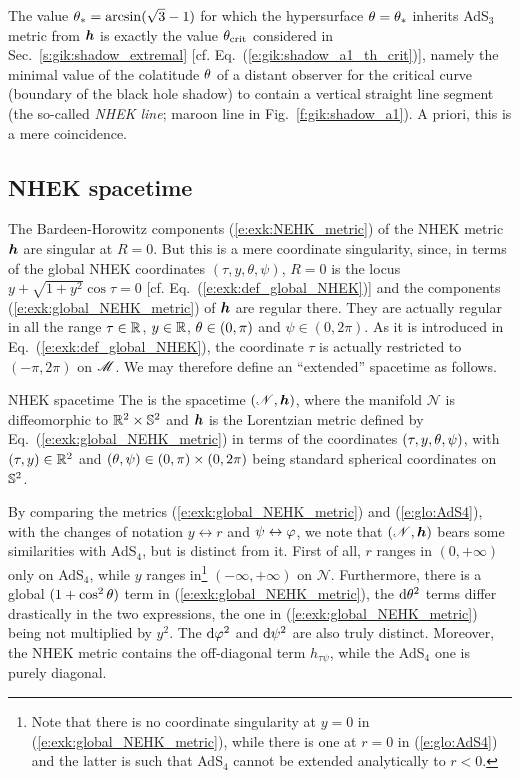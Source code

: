 \begin{remark}
The value $\theta_* = \arcsin(\sqrt{3} - 1)$ for which the hypersurface
$\theta = \theta_*$ inherits AdS$_3$ metric from $\bm{h}$ is exactly
the value $\theta_{\rm crit}$ considered in Sec.~\ref{s:gik:shadow_extremal}
[cf. Eq.~(\ref{e:gik:shadow_a1_th_crit})], namely
the minimal value of the colatitude $\theta$ of a distant observer
for the critical curve
(boundary of the black hole shadow) to contain a vertical straight line segment
(the so-called \emph{NHEK line}; maroon line in Fig.~\ref{f:gik:shadow_a1}).
A priori, this is a mere coincidence.
\end{remark}



\subsection{NHEK spacetime} \label{s:exk:NHEK_spacetime}

The Bardeen-Horowitz components (\ref{e:exk:NEHK_metric}) of the NHEK metric $\bm{h}$
are singular at $R=0$. But this is a mere coordinate singularity, since,
in terms of the global NHEK coordinates
$(\tau,y,\theta,\psi)$, $R=0$ is the locus $y + \sqrt{1 + y^2}\cos\tau = 0$
[cf. Eq.~(\ref{e:exk:def_global_NHEK})] and
the components (\ref{e:exk:global_NEHK_metric})
of $\bm{h}$ are regular there.
They are actually regular in all the range $\tau\in\mathbb{R}$, $y\in\mathbb{R}$, $\theta\in(0,\pi)$
and $\psi\in(0,2\pi)$.
As it is introduced in Eq.~(\ref{e:exk:def_global_NHEK}),
the coordinate $\tau$ is actually restricted to $(-\pi, 2\pi)$ on $\mathscr{M}$. We may therefore
define an ``extended'' spacetime as follows.

\begin{tdef}{NHEK spacetime}{}
The  is the spacetime $(\mathscr{N},\bm{h})$, where
the manifold $\mathscr{N}$ is diffeomorphic to $\mathbb{R}^2\times \mathbb{S}^2$ and $\bm{h}$ is the
Lorentzian metric defined by Eq.~(\ref{e:exk:global_NEHK_metric}) in terms
of the coordinates $(\tau,y,\theta,\psi)$, with $(\tau,y)\in \mathbb{R}^2$ and
$(\theta,\psi)\in(0,\pi)\times(0,2\pi)$ being standard spherical coordinates on $\mathbb{S}^2$.
\end{tdef}
By comparing the metrics (\ref{e:exk:global_NEHK_metric}) and
(\ref{e:glo:AdS4}), with the changes of notation $y\leftrightarrow r$
and $\psi\leftrightarrow \varphi$, we note that
$(\mathscr{N},\bm{h})$ bears some similarities with AdS$_4$, but is
distinct from it. First of all, $r$ ranges in $(0, +\infty)$ only
on AdS$_4$, while $y$ ranges in\footnote{Note that there
is no coordinate singularity at $y=0$ in (\ref{e:exk:global_NEHK_metric}), while
there is one at $r=0$ in (\ref{e:glo:AdS4}) and the latter is such that AdS$_4$ cannot
be extended analytically to $r<0$.} $(-\infty, +\infty)$ on $\mathscr{N}$.
Furthermore, there is a global $(1 + \cos^2\theta)$ term in (\ref{e:exk:global_NEHK_metric}),
the $\mathrm{d}\theta^2$ terms differ drastically in the two expressions, the one in
(\ref{e:exk:global_NEHK_metric}) being not multiplied by $y^2$.
The $\mathrm{d}\varphi^2$ and $\mathrm{d}\psi^2$ are also truly distinct. Moreover, the NHEK metric
contains the off-diagonal term $h_{\tau\psi}$, while
the AdS$_4$ one is purely diagonal.

